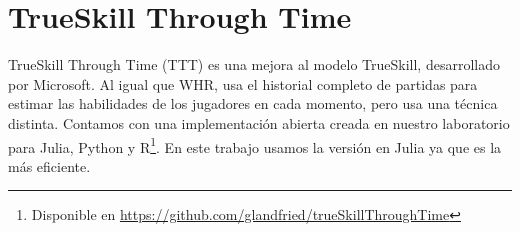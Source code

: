 \documentclass[a4paper,10pt]{report}
\begin{document}
\section*{TrueSkill Through Time}

TrueSkill Through Time (TTT) es una mejora al modelo TrueSkill, desarrollado por Microsoft.
Al igual que WHR, usa el historial completo de partidas para estimar las habilidades de los jugadores en cada momento, pero usa una técnica distinta.
Contamos con una implementación abierta creada en nuestro laboratorio para Julia, Python y R\footnote{Disponible en \url{https://github.com/glandfried/trueSkillThroughTime}}.
En este trabajo usamos la versión en Julia ya que es la más eficiente.

\end{document}

